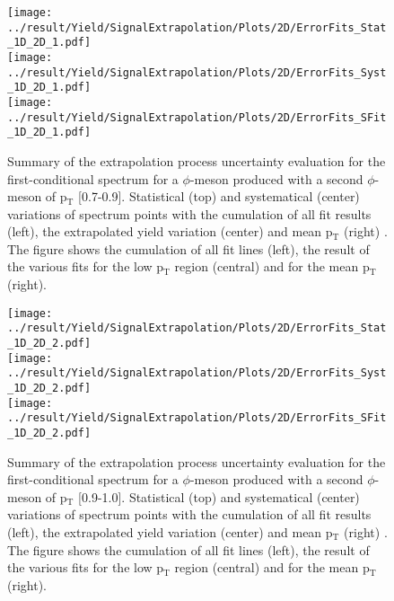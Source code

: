 \begin{figure}
\centering
\texttt{[image: ../result/Yield/SignalExtrapolation/Plots/2D/ErrorFits\_Stat\_1D\_2D\_1.pdf]}\\
\texttt{[image: ../result/Yield/SignalExtrapolation/Plots/2D/ErrorFits\_Syst\_1D\_2D\_1.pdf]}\\
\texttt{[image: ../result/Yield/SignalExtrapolation/Plots/2D/ErrorFits\_SFit\_1D\_2D\_1.pdf]}
\label{fig:Extrap2D_1}
\caption{Summary of the extrapolation process uncertainty evaluation for the first-conditional spectrum for a $\phi$-meson produced with a second $\phi$-meson of p$_{\text{T}}$ [0.7-0.9]. Statistical (top) and systematical (center) variations of spectrum points with the cumulation of all fit results (left), the extrapolated yield variation (center) and mean p$_{\text{T}}$ (right) . The figure shows the cumulation of all fit lines (left), the result of the various fits for the low p$_{\text{T}}$ region (central) and for the mean p$_{\text{T}}$ (right).}
\end{figure}

\begin{figure}
\centering
\texttt{[image: ../result/Yield/SignalExtrapolation/Plots/2D/ErrorFits\_Stat\_1D\_2D\_2.pdf]}\\
\texttt{[image: ../result/Yield/SignalExtrapolation/Plots/2D/ErrorFits\_Syst\_1D\_2D\_2.pdf]}\\
\texttt{[image: ../result/Yield/SignalExtrapolation/Plots/2D/ErrorFits\_SFit\_1D\_2D\_2.pdf]}
\label{fig:Extrap2D_2}
\caption{Summary of the extrapolation process uncertainty evaluation for the first-conditional spectrum for a $\phi$-meson produced with a second $\phi$-meson of p$_{\text{T}}$ [0.9-1.0]. Statistical (top) and systematical (center) variations of spectrum points with the cumulation of all fit results (left), the extrapolated yield variation (center) and mean p$_{\text{T}}$ (right) . The figure shows the cumulation of all fit lines (left), the result of the various fits for the low p$_{\text{T}}$ region (central) and for the mean p$_{\text{T}}$ (right).}
\end{figure}

